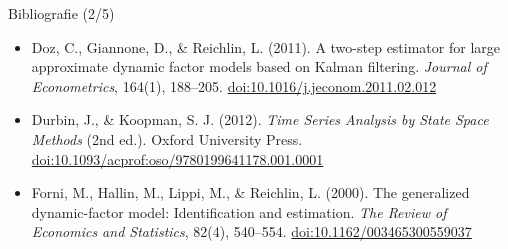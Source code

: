 \begin{frame}{Bibliografie (2/5)}
\begin{itemize}
    \item Doz, C., Giannone, D., \& Reichlin, L. (2011). A two-step estimator for large approximate dynamic factor models based on Kalman filtering. \textit{Journal of Econometrics}, 164(1), 188--205. \href{https://doi.org/10.1016/j.jeconom.2011.02.012}{doi:10.1016/j.jeconom.2011.02.012}
    \item Durbin, J., \& Koopman, S. J. (2012). \textit{Time Series Analysis by State Space Methods} (2nd ed.). Oxford University Press. \href{https://doi.org/10.1093/acprof:oso/9780199641178.001.0001}{doi:10.1093/acprof:oso/9780199641178.001.0001}
    \item Forni, M., Hallin, M., Lippi, M., \& Reichlin, L. (2000). The generalized dynamic-factor model: Identification and estimation. \textit{The Review of Economics and Statistics}, 82(4), 540--554. \href{https://doi.org/10.1162/003465300559037}{doi:10.1162/003465300559037}
\end{itemize}
\end{frame}

